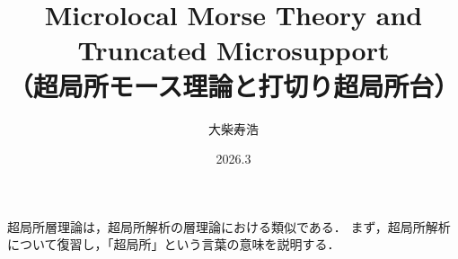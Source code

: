 ﻿\documentclass[a4paper]{jsarticle}
\title{Microlocal Morse Theory and Truncated Microsupport\\（超局所モース理論と打切り超局所台）}
\author{大柴寿浩}
\date{2026.3} %
\theoremstyle{definition}
\numberwithin{equation}{section}
\theoremstyle{mystyle}
\begin{document}
\begin{gaiyo}

  超局所層理論は，超局所解析の層理論における類似である．
  まず，超局所解析について復習し，「超局所」という言葉の意味を説明する．


\end{gaiyo}
\end{document}

